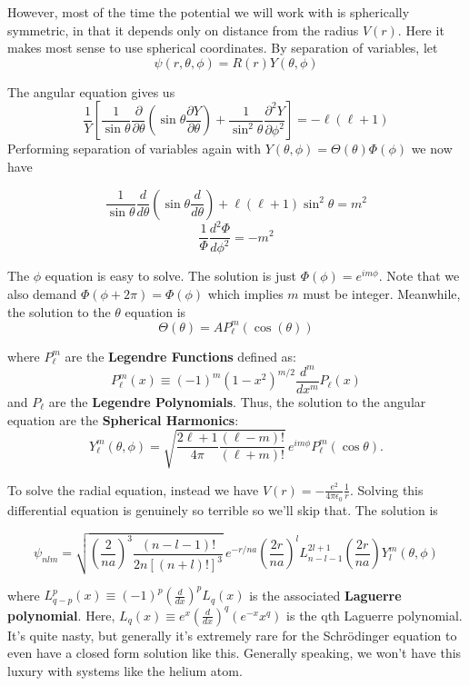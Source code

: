 \documentclass[11pt]{article}
\begin{document}
\noindent However, most of the time the potential we will work with is spherically symmetric, in that it depends only on distance from the
radius \(V(r)\). Here it makes most sense to use spherical coordinates. By separation of variables, let 
\[
    \psi(r, \theta, \phi) = R(r)Y(\theta,\phi)
\]

\noindent The angular equation gives us
\[\frac{1}{Y}\left[\frac{1}{\sin\theta}\frac{\partial}{\partial\theta}\left(\sin\theta \frac{\partial Y}{\partial\theta}\right)
+
\frac{1}{\sin^2\theta}\frac{\partial^2 Y}{\partial\phi^2}\right]= -\ell(\ell+1)\]
\noindent Performing separation of variables again with \(Y(\theta,\phi) = \Theta(\theta)\Phi(\phi)\) we now have

    \[
        \frac{1}{\sin\theta}\frac{d}{d\theta}\left(\sin\theta \frac{d}{d\theta}\right)
        +
        \ell(\ell+1)\sin^2\theta = m^2
    \]
    \[
        \frac{1}{\Phi}\frac{d^2\Phi}{d\phi^2} = -m^2
    \]

\noindent The \(\phi\) equation is easy to solve. The solution is just \(\Phi(\phi) = e^{im\phi}\). Note that we also demand 
\(\Phi(\phi+2\pi) = \Phi(\phi)\) which implies \(m\) must be integer. Meanwhile, the solution to the \(\theta\) equation is 
\[
    \Theta(\theta) = AP_{\ell}^m(\cos{\left(\theta\right)})
\]

\noindent where \(P_\ell^m\) are the \textbf{Legendre Functions} defined as:
\[
P_\ell^m(x)
\equiv
(-1)^m (1-x^2)^{m/2}
\frac{d^m}{dx^m} P_\ell(x)
\]
\noindent and \(P_\ell\) are the \textbf{Legendre Polynomials}. Thus, the solution to the angular equation are the \textbf{Spherical Harmonics}:
\[
Y_\ell^m(\theta,\phi)
=
\sqrt{
\frac{2\ell+1}{4\pi}
\frac{(\ell-m)!}{(\ell+m)!}
}
\, e^{im\phi}
P_\ell^m(\cos\theta).
\]

\noindent To solve the radial equation, instead we have \( V(r) = -\frac{e^{2}}{4\pi\epsilon_{0}}\frac{1}{r} \). Solving this differential equation is
genuinely so terrible so we'll skip that. The solution is

\[ 
    \psi_{nlm} = \sqrt{\left(\frac{2}{na}\right)^3 \frac{(n-l-1)!}{2n[(n+l)!]^3}} \, e^{-r/na} \left(\frac{2r}{na}\right)^l L_{n-l-1}^{2l+1}\!\left(\frac{2r}{na}\right) Y_l^m(\theta,\phi) 
\]

\noindent where \( L^{p}_{q-p}(x) \equiv (-1)^{p}(\frac{d}{dx})^p L_{q}(x) \) is the associated \textbf{Laguerre polynomial}. Here, \( L_{q}(x) \equiv e^{x}(\frac{d}{dx})^q(e^{-x}x^{q}) \)
is the qth Laguerre polynomial. It's quite nasty, but generally it's extremely rare for the Schr\"odinger equation to even have a closed form solution like this. Generally speaking, we won't
have this luxury with systems like the helium atom.
\\
\\
\end{document}
